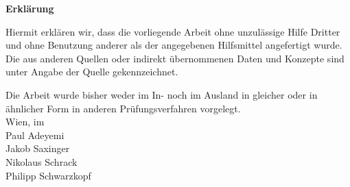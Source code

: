 \thispagestyle{empty}
\vspace*{2cm}
\begin{center}
{\bf \sf \huge Erkl{\"a}rung}
\end{center}
{\sf \vspace{1cm} Hiermit erkl{\"a}ren wir, dass die vorliegende
Arbeit ohne unzul{\"a}ssige Hilfe Dritter und ohne Benutzung
anderer als der angegebenen Hilfsmittel angefertigt wurde. Die aus
anderen Quellen oder indirekt übernommenen Daten und Konzepte sind
unter Angabe der Quelle gekennzeichnet.

Die Arbeit wurde bisher weder im In- noch im Ausland in gleicher
oder in {\"a}hnlicher Form in anderen Pr{\"u}fungsverfahren
vorgelegt.
\\[1.5cm]
Wien, im \monthdis
\\[2cm]
Paul Adeyemi
\\[2cm]
Jakob Saxinger
\\[2cm]
Nikolaus Schrack
\\[2cm]
Philipp Schwarzkopf
}%
